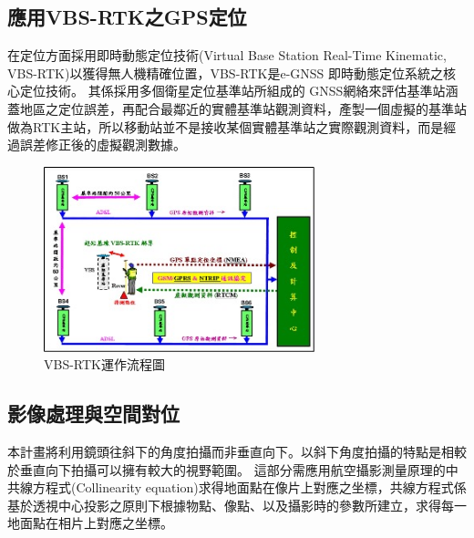 \documentclass[12pt]{article}       %
\renewcommand{\figurename}{圖}                           %
\begin{document}
\subsection{應用VBS-RTK之GPS定位}
\hspace{2em}在定位方面採用即時動態定位技術(Virtual Base Station Real-Time Kinematic, VBS-RTK)以獲得無人機精確位置，VBS-RTK是e-GNSS 即時動態定位系統之核心定位技術。
其係採用多個衛星定位基準站所組成的 GNSS網絡來評估基準站涵蓋地區之定位誤差，再配合最鄰近的實體基準站觀測資料，產製一個虛擬的基準站做為RTK主站，所以移動站並不是接收某個實體基準站之實際觀測資料，而是經過誤差修正後的虛擬觀測數據。

\begin{figure}[H]
    \centering
    \renewcommand{\figurename}{圖}                              %
    \includegraphics[width=0.7\textwidth]{vbsrtk.jpg}         %
    \caption{VBS-RTK運作流程圖\cite{egnss_2020}}           %
    \label{fig:vbsrtk}                                        %
\end{figure}

\subsection{影像處理與空間對位}
\hspace{2em}本計畫將利用鏡頭往斜下的角度拍攝而非垂直向下。以斜下角度拍攝的特點是相較於垂直向下拍攝可以擁有較大的視野範圍。
這部分需應用航空攝影測量原理\cite{zhao2013}的中共線方程式(Collinearity equation)求得地面點在像片上對應之坐標，共線方程式係基於透視中心投影之原則下根據物點、像點、以及攝影時的參數所建立，求得每一地面點在相片上對應之坐標。
\end{document}
